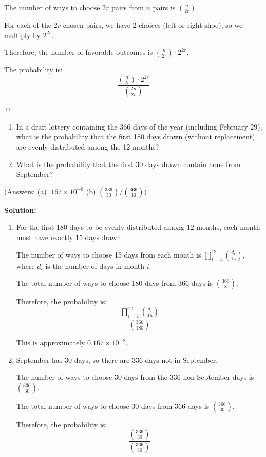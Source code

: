 The number of ways to choose $2r$ pairs from $n$ pairs is $\binom{n}{2r}$.

For each of the $2r$ chosen pairs, we have 2 choices (left or right shoe), so we multiply by $2^{2r}$.

Therefore, the number of favorable outcomes is $\binom{n}{2r} \cdot 2^{2r}$.

The probability is:
\[ \frac{\binom{n}{2r} \cdot 2^{2r}}{\binom{2n}{2r}} \]



\qed
\begin{problembox}
\begin{enumerate}[label=(\alph*)]
    \item In a draft lottery containing the 366 days of the year (including February 29), what is the probability that the first 180 days drawn (without replacement) are evenly distributed among the 12 months?
    \item What is the probability that the first 30 days drawn contain none from September?
\end{enumerate}
(Answers: (a) $.167\times 10^{-8}$ (b) $\binom{336}{30}/\binom{366}{30}$)
\end{problembox}

\noindent\textbf{Solution:}
\begin{enumerate}[label=(\alph*)]
    \item For the first 180 days to be evenly distributed among 12 months, each month must have exactly 15 days drawn.
    
    The number of ways to choose 15 days from each month is $\prod_{i=1}^{12} \binom{d_i}{15}$, where $d_i$ is the number of days in month $i$.
    
    The total number of ways to choose 180 days from 366 days is $\binom{366}{180}$.
    
    Therefore, the probability is:
    \[ \frac{\prod_{i=1}^{12} \binom{d_i}{15}}{\binom{366}{180}} \]
    
    This is approximately $0.167 \times 10^{-8}$.
    
    \item September has 30 days, so there are 336 days not in September.
    
    The number of ways to choose 30 days from the 336 non-September days is $\binom{336}{30}$.
    
    The total number of ways to choose 30 days from 366 days is $\binom{366}{30}$.
    
    Therefore, the probability is:
    \[ \frac{\binom{336}{30}}{\binom{366}{30}} \]
\end{enumerate}



